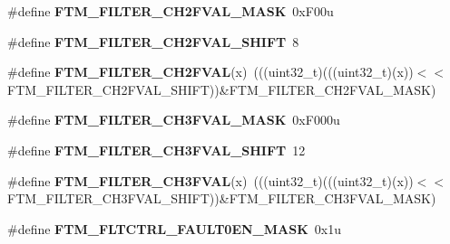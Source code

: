 \begin{DoxyCompactItemize}
\item 
\#define {\bfseries F\+T\+M\+\_\+\+F\+I\+L\+T\+E\+R\+\_\+\+C\+H2\+F\+V\+A\+L\+\_\+\+M\+A\+SK}~0x\+F00u\hypertarget{group__FTM__Register__Masks_ga33bec78729047fa99f4534d68d36f696}{}\label{group__FTM__Register__Masks_ga33bec78729047fa99f4534d68d36f696}

\item 
\#define {\bfseries F\+T\+M\+\_\+\+F\+I\+L\+T\+E\+R\+\_\+\+C\+H2\+F\+V\+A\+L\+\_\+\+S\+H\+I\+FT}~8\hypertarget{group__FTM__Register__Masks_ga9d2eef1684a2f4dbb28931408cf3248f}{}\label{group__FTM__Register__Masks_ga9d2eef1684a2f4dbb28931408cf3248f}

\item 
\#define {\bfseries F\+T\+M\+\_\+\+F\+I\+L\+T\+E\+R\+\_\+\+C\+H2\+F\+V\+AL}(x)~(((uint32\+\_\+t)(((uint32\+\_\+t)(x))$<$$<$F\+T\+M\+\_\+\+F\+I\+L\+T\+E\+R\+\_\+\+C\+H2\+F\+V\+A\+L\+\_\+\+S\+H\+I\+FT))\&F\+T\+M\+\_\+\+F\+I\+L\+T\+E\+R\+\_\+\+C\+H2\+F\+V\+A\+L\+\_\+\+M\+A\+SK)\hypertarget{group__FTM__Register__Masks_ga56a86c7e68150dbdb4b8df6b3762d46d}{}\label{group__FTM__Register__Masks_ga56a86c7e68150dbdb4b8df6b3762d46d}

\item 
\#define {\bfseries F\+T\+M\+\_\+\+F\+I\+L\+T\+E\+R\+\_\+\+C\+H3\+F\+V\+A\+L\+\_\+\+M\+A\+SK}~0x\+F000u\hypertarget{group__FTM__Register__Masks_gadced1643670251bc672a6903b3cd7f29}{}\label{group__FTM__Register__Masks_gadced1643670251bc672a6903b3cd7f29}

\item 
\#define {\bfseries F\+T\+M\+\_\+\+F\+I\+L\+T\+E\+R\+\_\+\+C\+H3\+F\+V\+A\+L\+\_\+\+S\+H\+I\+FT}~12\hypertarget{group__FTM__Register__Masks_ga23a151bbeb877a2e2790071b9947bc30}{}\label{group__FTM__Register__Masks_ga23a151bbeb877a2e2790071b9947bc30}

\item 
\#define {\bfseries F\+T\+M\+\_\+\+F\+I\+L\+T\+E\+R\+\_\+\+C\+H3\+F\+V\+AL}(x)~(((uint32\+\_\+t)(((uint32\+\_\+t)(x))$<$$<$F\+T\+M\+\_\+\+F\+I\+L\+T\+E\+R\+\_\+\+C\+H3\+F\+V\+A\+L\+\_\+\+S\+H\+I\+FT))\&F\+T\+M\+\_\+\+F\+I\+L\+T\+E\+R\+\_\+\+C\+H3\+F\+V\+A\+L\+\_\+\+M\+A\+SK)\hypertarget{group__FTM__Register__Masks_ga777ead7813671a9cacf617c172c1181b}{}\label{group__FTM__Register__Masks_ga777ead7813671a9cacf617c172c1181b}

\item 
\#define {\bfseries F\+T\+M\+\_\+\+F\+L\+T\+C\+T\+R\+L\+\_\+\+F\+A\+U\+L\+T0\+E\+N\+\_\+\+M\+A\+SK}~0x1u\hypertarget{group__FTM__Register__Masks_ga55aa390cdac6997c93f7385ab41047ce}{}\label{group__FTM__Register__Masks_ga55aa390cdac6997c93f7385ab41047ce}


\end{DoxyCompactItemize}
